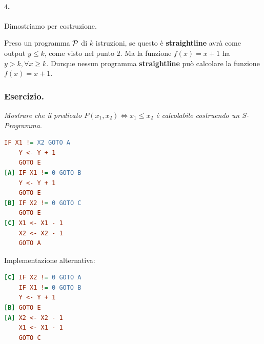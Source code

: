 \paragraph*{\(4\).} Dimostriamo per costruzione.\label{Esercizio Straightline f(x)=x+1}

Preso un programma \(\mathcal{P}\) di \(k\) istruzioni, se questo è \textbf{straightline} avrà come output \(y\leq k\), come visto nel punto \(2\). Ma la funzione \(f(x)=x+1\) ha \(y>k, \forall x \geq k\).
Dunque nessun programma \textbf{straightline} può calcolare la funzione \(f(x)=x+1\).

\subsubsection*{Esercizio.} \textit{Mostrare che il predicato \(P(x_1, x_2)\iff x_1\leq x_2\) è calcolabile costruendo un S-Programma}.

\begin{lstlisting}[language=ini, label={Predicato Minore Uguale},  caption=Predicato Minore Uguale]
    IF X1 != X2 GOTO A
    Y <- Y + 1
    GOTO E
[A] IF X1 != 0 GOTO B
    Y <- Y + 1
    GOTO E
[B] IF X2 != 0 GOTO C
    GOTO E
[C] X1 <- X1 - 1
    X2 <- X2 - 1
    GOTO A
\end{lstlisting}

Implementazione alternativa:

\begin{lstlisting}[language=ini, label={Predicato Minore Uguale AltVer},  caption=Predicato Minore Uguale]
[C] IF X2 != 0 GOTO A
    IF X1 != 0 GOTO B
    Y <- Y + 1
[B] GOTO E
[A] X2 <- X2 - 1
    X1 <- X1 - 1
    GOTO C
\end{lstlisting}
